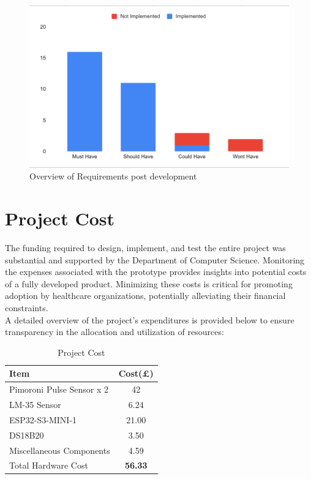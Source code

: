 \begin{figure}
    \centering
    \includegraphics[width=1\linewidth]{images/revisitedr.png}
    \caption{Overview of Requirements post development}
    \label{fig:revisited-requirements}
\end{figure}

\section{Project Cost}
The funding required to design, implement, and test the entire project was substantial and supported by the Department of Computer Science. Monitoring the expenses associated with the prototype provides insights into potential costs of a fully developed product. Minimizing these costs is critical for promoting adoption by healthcare organizations, potentially alleviating their financial constraints. \\

\noindent A detailed overview of the project's expenditures is provided below to ensure transparency in the allocation and utilization of resources:

\begin{table}[h!]
    \centering
    \begin{tabularx}{\textwidth}{|X|c|}
    \hline 
         \textbf{Item}& \textbf{Cost(£)}  \\ \hline
        Pimoroni Pulse Sensor x 2    &  42 \\ 
        LM-35 Sensor & 6.24 \\ 
        ESP32-S3-MINI-1 & 21.00 \\
        DS18B20 & 3.50 \\
        Miscellaneous Components & 4.59 \\ \hline
        Total Hardware Cost & \textbf{56.33} \\ \hline
        
    \end{tabularx}
    \caption{Project Cost}
    \label{tab:project-cost}
\end{table}

